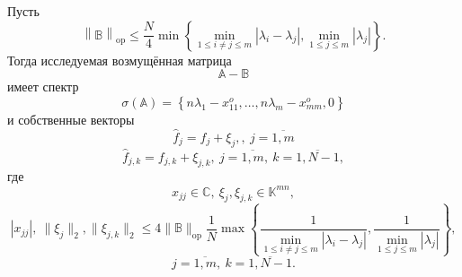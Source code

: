 \begin{ksvthm}
    Пусть
    \[
        \left\| \mathbb{B} \right\|_{\mathrm{op}}
        \leq 
        \frac{N}{4}
         \min\left\{
             \min\limits_{1\leq i{\neq}j \leq m }{|\lambda_i - \lambda_j|},
             \min\limits_{1\leq j \leq m}{|\lambda_j|}
         \right\}.
        \]
    Тогда исследуемая возмущённая матрица
    \[
        \mathbb{A} - \mathbb{B}
        \]
    имеет спектр
    \[
        \sigma\left(\mathbb{A}\right) =
        \left\{
            n\lambda_1 - x_{11}^o, \ldots, n\lambda_m - x_{mm}^o, 0
        \right\}
        \]
    и собственные векторы
    \[
        \hat{f}_j = f_j + \xi_j,
        ,\ j{=}\overline{1,m}
        \]
    \[
        \hat{f}_{j,k} = f_{j,k} + \xi_{j,k},
        \ j{=}\overline{1,m},
        \ k{=}\overline{1,N{-}1},
        \]
    где
    \[
        x_{jj}{\in}\mathbb{C},
        \ \xi_j, \xi_{j,k}{\in}\mathbb{K}^{mn},
        \]
    \[
        |x_{jj}|,\ \|\xi_j\|_2, \|\xi_{j,k}\|_2 \leq
        4 \|\mathbb{B}\|_{\mathrm{op}} 
          \frac1N
          \max\left\{
          \frac{1}{
              \min\limits_{1\leq i{\neq}j \leq m }{|\lambda_i - \lambda_j|}},
          \frac{1}{
              \min\limits_{1\leq j \leq m}{|\lambda_j|}}
          \right\},
        \]
    \[
        j{=}\overline{1,m},
        \ k{=}\overline{1,N{-}1}.
        \]
\end{ksvthm}
